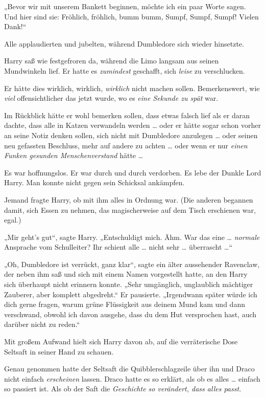 {„Bevor wir mit unserem Bankett beginnen, möchte ich ein paar Worte sagen. Und hier sind sie: Fröhlich, fröhlich, bumm bumm, Sumpf, Sumpf, Sumpf! Vielen Dank!“

Alle applaudierten und jubelten, während Dumbledore sich wieder hinsetzte.

Harry saß wie festgefroren da, während die Limo langsam aus seinen Mundwinkeln lief. Er hatte es \emph{zumindest} geschafft, sich \emph{leise} zu verschlucken.

Er hätte dies wirklich, wirklich, \emph{wirklich} nicht machen sollen. Bemerkenswert, wie \emph{viel} offensichtlicher das jetzt wurde, wo es \emph{eine Sekunde zu spät} war.

Im Rückblick hätte er wohl bemerken sollen, dass etwas falsch lief als er daran dachte, dass alle in Katzen verwandeln werden … oder er hätte sogar schon vorher an seine Notiz denken sollen, sich nicht mit Dumbledore anzulegen … oder seinen neu gefassten Beschluss, mehr auf andere zu achten … oder wenn er nur \emph{einen Funken gesunden Menschenverstand} hätte …

Es war hoffnungslos. Er war durch und durch verdorben. Es lebe der Dunkle Lord Harry. Man konnte nicht gegen sein Schicksal ankämpfen.

Jemand fragte Harry, ob mit ihm alles in Ordnung war. (Die anderen begannen damit, sich Essen zu nehmen, das magischerweise auf dem Tisch erschienen war, egal.)

„Mir geht's gut“, sagte Harry. „Entschuldigt mich. Ähm. War das eine … \emph{normale} Ansprache vom Schulleiter? Ihr schient alle … nicht sehr … überrascht …“

„Oh, Dumbledore ist verrückt, ganz klar“, sagte ein älter aussehender Ravenclaw, der neben ihm saß und sich mit einem Namen vorgestellt hatte, an den Harry sich überhaupt nicht erinnern konnte. „Sehr umgänglich, unglaublich mächtiger Zauberer, aber komplett abgedreht.“ Er pausierte. „Irgendwann später würde ich dich gerne fragen, warum grüne Flüssigkeit aus deinem Mund kam und dann verschwand, obwohl ich davon ausgehe, dass du dem Hut versprochen hast, auch darüber nicht zu reden.“

Mit großem Aufwand hielt sich Harry davon ab, auf die verräterische Dose Seltsaft in seiner Hand zu schauen.

Genau genommen hatte der Seltsaft die Quibblerschlagzeile über ihn und Draco nicht einfach \emph{erscheinen} lassen. Draco hatte es so erklärt, als ob es alles … einfach so passiert ist. Als ob der Saft die \emph{Geschichte so verändert, dass alles passt.}

}

